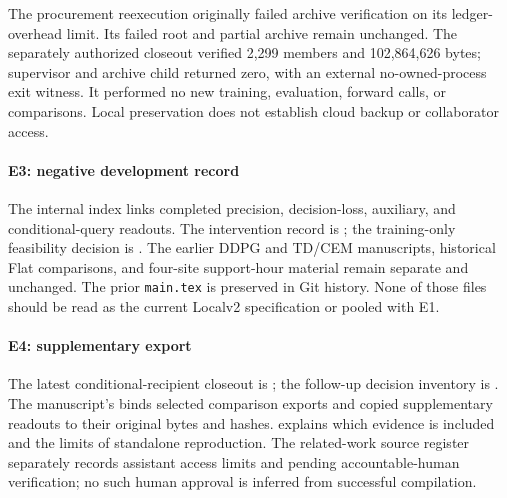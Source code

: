 \documentclass[preprint,12pt]{elsarticle}
\begin{document}
The procurement reexecution originally failed archive verification on its
ledger-overhead limit. Its failed root and partial archive remain unchanged.
The separately authorized closeout verified 2,299 members and 102,864,626 bytes;
supervisor and archive child returned zero, with an external no-owned-process
exit witness. It performed no new training, evaluation, forward calls, or
comparisons. Local preservation does not establish cloud backup or collaborator
access.

\paragraph{E3: negative development record}
The internal index
links completed precision, decision-loss, auxiliary, and conditional-query
readouts. The intervention record is
;
the training-only feasibility decision is
.
The earlier DDPG and TD/CEM manuscripts, historical Flat comparisons, and
four-site support-hour material remain separate and unchanged. The prior
\texttt{main.tex} is preserved in Git history. None of those files should be
read as the current Localv2 specification or pooled with E1.

\paragraph{E4: supplementary export}
The latest conditional-recipient closeout is
;
the follow-up decision inventory is
.
The manuscript's  binds selected comparison
exports and copied supplementary readouts to their original bytes and hashes.
 explains which evidence is included and the limits of
standalone reproduction. The related-work source register separately records
assistant access limits and pending accountable-human verification; no such
human approval is inferred from successful compilation.

\begingroup
\small


\endgroup
\end{document}
